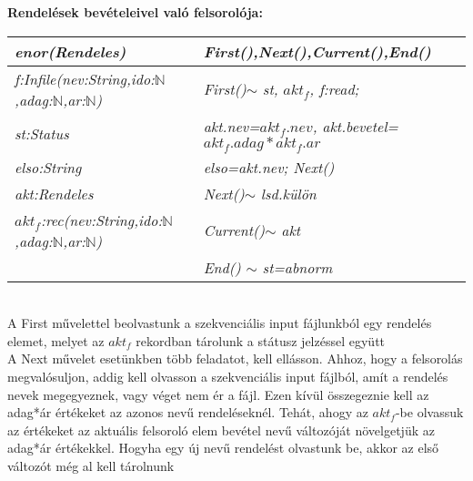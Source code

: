\documentclass[12pt,a4paper]{article}			%
\begin{document}
	\noindent\hfill
		\begin{stuki}[12cm]
			\begin{WHILE}{4}{}
				\begin{IF}[70]{2}{}
				\ELSE
				\end{IF}
			\end{WHILE}
		\end{stuki}
		\vspace{5mm}
	\textbf{Rendelések bevételeivel való felsorolója:}
	\vspace{5mm}\\
		\begin{tabular}{|l|l|}
			\hline
			\textit{enor(Rendeles)}& \textit{First(),Next(),Current(),End()}\\
			\hline
			\textit{f:Infile(nev:String,ido:$\mathbb{N}$,adag:$\mathbb{N}$,ar:$\mathbb{N}$) }& \textit{First()$\sim$ st, $akt_f$, f:read;}\\
			\textit{st:Status} & \textit{akt.nev=$akt_f.nev$, akt.bevetel=$akt_f.adag*akt_f.ar$}\\
			\textit{elso:String} & \textit{elso=akt.nev; Next()}\\
			\textit{akt:Rendeles} & \textit{Next()$\sim$ lsd.külön}\\
			\textit{$akt_f$:rec(nev:String,ido:$\mathbb{N}$,adag:$\mathbb{N}$,ar:$\mathbb{N}$)} & \textit{Current()$\sim$ akt}\\
			&\textit{End() $\sim$ st=abnorm}\\
			\hline
		\end{tabular}
	\vspace{5mm}\\
	\indent A First művelettel beolvastunk a szekvenciális input fájlunkból egy rendelés elemet, melyet az $akt_f$ rekordban tárolunk a státusz jelzéssel együtt \\
	\indent A Next művelet esetünkben több feladatot, kell ellásson. Ahhoz, hogy a felsorolás megvalósuljon, addig kell olvasson a szekvenciális input fájlból, amít a rendelés nevek megegyeznek, vagy véget nem ér a fájl. Ezen kívül összegeznie kell az adag*ár értékeket az azonos nevű rendeléseknél. Tehát, ahogy az $akt_f$-be olvassuk az értékeket az aktuális felsoroló elem bevétel nevű változóját növelgetjük az adag*ár értékekkel. Hogyha egy új nevű rendelést olvastunk be, akkor az első változót még al kell tárolnunk
\end{document}
